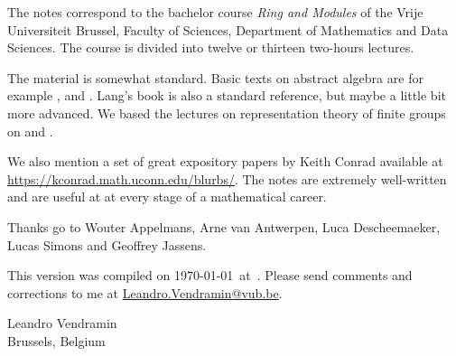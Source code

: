 \preface

The notes correspond to the bachelor 
course \emph{Ring and Modules} of the 
Vrije Universiteit Brussel, 
Faculty of Sciences, 
Department of Mathematics and Data Sciences. The course
is divided into twelve or thirteen two-hours lectures. 

The material is somewhat standard. Basic texts on abstract algebra
are for example \cite{MR1129886}, \cite{MR2286236} and \cite{MR600654}. 
Lang's book \cite{MR783636} is also a standard reference, but 
maybe a little bit more advanced. 
We based the lectures on representation theory of finite
groups on \cite{MR0450380} and 
\cite{MR2867444}. 

We also mention a set of great expository papers by 
Keith Conrad available at 
\url{https://kconrad.math.uconn.edu/blurbs/}. 
The notes are extremely well-written and are useful at  
at every stage of a mathematical career. 
 
Thanks go to Wouter Appelmans, Arne van Antwerpen, Luca Descheemaeker, Lucas Simons
and Geoffrey Jassens. 

This version 
was compiled on \today~at~\currenttime. 
Please send comments and corrections to me at \url{Leandro.Vendramin@vub.be}. 


\bigskip
\begin{flushright}
Leandro Vendramin\\Brussels, Belgium\par
\end{flushright}
